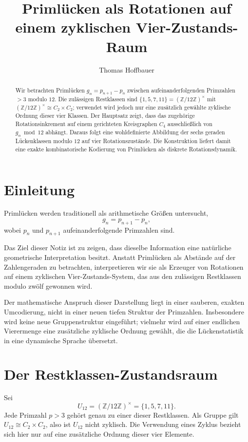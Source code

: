 \documentclass[11pt]{article}
\title{Priml\"ucken als Rotationen auf einem zyklischen Vier-Zustands-Raum}
\author{Thomas Hoffbauer}
\date{}
\theoremstyle{definition}
\begin{document}
\maketitle

\begin{abstract}
Wir betrachten Priml\"ucken $g_n=p_{n+1}-p_n$ zwischen aufeinanderfolgenden Primzahlen $>3$ modulo $12$. Die zul\"assigen Restklassen sind $\{1,5,7,11\}=(\mathbb{Z}/12\mathbb{Z})^\times$ mit $(\mathbb{Z}/12\mathbb{Z})^\times\cong C_2\times C_2$; verwendet wird jedoch nur eine zus\"atzlich gew\"ahlte zyklische Ordnung dieser vier Klassen. Der Hauptsatz zeigt, dass das zugeh\"orige Rotationsinkrement auf einem gerichteten Kreisgraphen $C_4$ ausschlie{\ss}lich von $g_n\bmod 12$ abh\"angt. Daraus folgt eine wohldefinierte Abbildung der sechs geraden L\"uckenklassen modulo $12$ auf vier Rotationszust\"ande. Die Konstruktion liefert damit eine exakte kombinatorische Kodierung von Priml\"ucken als diskrete Rotationsdynamik.
\end{abstract}

\section{Einleitung}

Priml\"ucken werden traditionell als arithmetische Gr\"o{\ss}en untersucht,
\[
g_n = p_{n+1}-p_n,
\]
wobei $p_n$ und $p_{n+1}$ aufeinanderfolgende Primzahlen sind.

Das Ziel dieser Notiz ist zu zeigen, dass dieselbe Information eine nat\"urliche geometrische Interpretation besitzt.
Anstatt Priml\"ucken als Abst\"ande auf der Zahlengeraden zu betrachten, interpretieren wir sie als Erzeuger von Rotationen auf einem zyklischen Vier-Zustands-System, das aus den zul\"assigen Restklassen modulo zw\"olf gewonnen wird.

Der mathematische Anspruch dieser Darstellung liegt in einer sauberen, exakten Umcodierung, nicht in einer neuen tiefen Struktur der Primzahlen. Insbesondere wird keine neue Gruppenstruktur eingef\"uhrt; vielmehr wird auf einer endlichen Vierermenge eine zus\"atzliche zyklische Ordnung gew\"ahlt, die die L\"uckenstatistik in eine dynamische Sprache \"ubersetzt.

\section{Der Restklassen-Zustandsraum}

Sei
\[
U_{12}
=
(\mathbb{Z}/12\mathbb{Z})^\times
=
\{1,5,7,11\}.
\]
Jede Primzahl $p>3$ geh\"ort genau zu einer dieser Restklassen.
Als Gruppe gilt $U_{12}\cong C_2\times C_2$, also ist $U_{12}$ nicht zyklisch.
Die Verwendung eines Zyklus bezieht sich hier nur auf eine zus\"atzliche Ordnung dieser vier Elemente.
\end{document}
